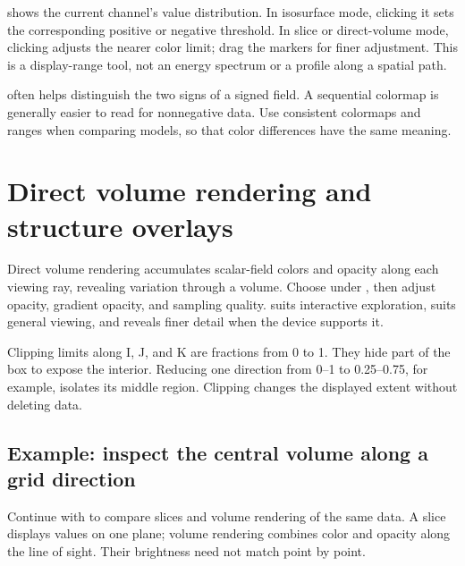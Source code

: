  shows the current channel's value distribution. In isosurface mode, clicking it sets the corresponding positive or negative threshold. In slice or direct-volume mode, clicking adjusts the nearer color limit; drag the markers for finer adjustment. This is a display-range tool, not an energy spectrum or a profile along a spatial path.

 often helps distinguish the two signs of a signed field. A sequential colormap is generally easier to read for nonnegative data. Use consistent colormaps and ranges when comparing models, so that color differences have the same meaning.

\section{Direct volume rendering and structure overlays}

Direct volume rendering accumulates scalar-field colors and opacity along each viewing ray, revealing variation through a volume. Choose  under , then adjust opacity, gradient opacity, and sampling quality.  suits interactive exploration,  suits general viewing, and  reveals finer detail when the device supports it.

Clipping limits along I, J, and K are fractions from 0 to 1. They hide part of the box to expose the interior. Reducing one direction from 0--1 to 0.25--0.75, for example, isolates its middle region. Clipping changes the displayed extent without deleting data.

\subsection{Example: inspect the central volume along a grid direction}

Continue with  to compare slices and volume rendering of the same data. A slice displays values on one plane; volume rendering combines color and opacity along the line of sight. Their brightness need not match point by point.

